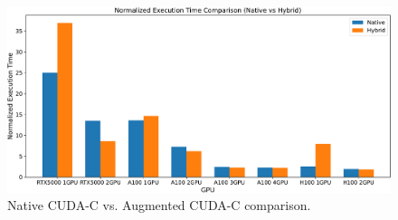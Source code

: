 \begin{figure}[H]
  \centering
  \includegraphics[width=1.0\linewidth, height=0.70\linewidth ]{Images/DiffHardware -crop.pdf}
  \caption{Native CUDA-C vs. Augmented CUDA-C comparison.}
  \label{fig:1}
\end{figure}
